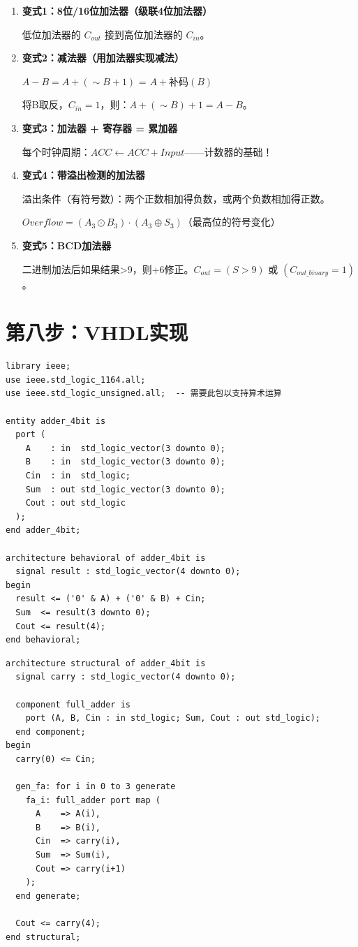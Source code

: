\begin{enumerate}
  \item \textbf{变式1：8位/16位加法器（级联4位加法器）}

  低位加法器的 $C_{out}$ 接到高位加法器的 $C_{in}$。

  \item \textbf{变式2：减法器（用加法器实现减法）}

  $A - B = A + (\sim B + 1)$ = $A + \text{补码}(B)$

  将B取反，$C_{in}=1$，则：$A + (\sim B) + 1 = A - B$。

  \item \textbf{变式3：加法器 + 寄存器 = 累加器}

  每个时钟周期：$ACC \leftarrow ACC + Input$——计数器的基础！

  \item \textbf{变式4：带溢出检测的加法器}

  溢出条件（有符号数）：两个正数相加得负数，或两个负数相加得正数。

  $Overflow = (A_3 \odot B_3) \cdot (A_3 \oplus S_3)$（最高位的符号变化）

  \item \textbf{变式5：BCD加法器}

  二进制加法后如果结果>9，则+6修正。$C_{out} = (S > 9)$ 或 $(C_{out\_binary} = 1)$。
\end{enumerate}

\section{第八步：VHDL实现}

\begin{lstlisting}[caption={4位加法器VHDL实现（行为级）}]
library ieee;
use ieee.std_logic_1164.all;
use ieee.std_logic_unsigned.all;  -- 需要此包以支持算术运算

entity adder_4bit is
  port (
    A    : in  std_logic_vector(3 downto 0);
    B    : in  std_logic_vector(3 downto 0);
    Cin  : in  std_logic;
    Sum  : out std_logic_vector(3 downto 0);
    Cout : out std_logic
  );
end adder_4bit;

architecture behavioral of adder_4bit is
  signal result : std_logic_vector(4 downto 0);
begin
  result <= ('0' & A) + ('0' & B) + Cin;
  Sum  <= result(3 downto 0);
  Cout <= result(4);
end behavioral;
\end{lstlisting}

\begin{lstlisting}[caption={结构级实现（4个全加器级联）}]
architecture structural of adder_4bit is
  signal carry : std_logic_vector(4 downto 0);

  component full_adder is
    port (A, B, Cin : in std_logic; Sum, Cout : out std_logic);
  end component;
begin
  carry(0) <= Cin;

  gen_fa: for i in 0 to 3 generate
    fa_i: full_adder port map (
      A    => A(i),
      B    => B(i),
      Cin  => carry(i),
      Sum  => Sum(i),
      Cout => carry(i+1)
    );
  end generate;

  Cout <= carry(4);
end structural;
\end{lstlisting}

